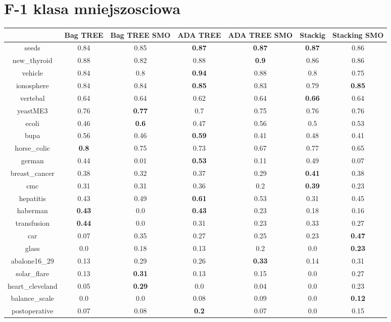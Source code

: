 \documentclass{article}%
\begin{document}
\section*{F{-}1 klasa mniejszosciowa}%
\begin{tabular}{c|cccccc}%
&Bag TREE&Bag TREE SMO&ADA TREE&ADA TREE SMO&Stackig&Stacking SMO\\%
\hline%
seeds&0.84&0.85&\textbf{0.87}&\textbf{0.87}&\textbf{0.87}&0.86\\%
new\_thyroid&0.88&0.82&0.88&\textbf{0.9}&0.86&0.86\\%
vehicle&0.84&0.8&\textbf{0.94}&0.88&0.8&0.75\\%
ionosphere&0.84&0.84&\textbf{0.85}&0.83&0.79&\textbf{0.85}\\%
vertebal&0.64&0.64&0.62&0.64&\textbf{0.66}&0.64\\%
yeastME3&0.76&\textbf{0.77}&0.7&0.75&0.76&0.76\\%
ecoli&0.46&\textbf{0.6}&0.47&0.56&0.5&0.53\\%
bupa&0.56&0.46&\textbf{0.59}&0.41&0.48&0.41\\%
horse\_colic&\textbf{0.8}&0.75&0.73&0.67&0.77&0.65\\%
german&0.44&0.01&\textbf{0.53}&0.11&0.49&0.07\\%
breast\_cancer&0.38&0.32&0.37&0.29&\textbf{0.41}&0.38\\%
cmc&0.31&0.31&0.36&0.2&\textbf{0.39}&0.23\\%
hepatitis&0.43&0.49&\textbf{0.61}&0.53&0.31&0.45\\%
haberman&\textbf{0.43}&0.0&\textbf{0.43}&0.23&0.18&0.16\\%
transfusion&\textbf{0.44}&0.0&0.31&0.23&0.33&0.27\\%
car&0.07&0.35&0.27&0.25&0.23&\textbf{0.47}\\%
glass&0.0&0.18&0.13&0.2&0.0&\textbf{0.23}\\%
abalone16\_29&0.13&0.29&0.26&\textbf{0.33}&0.14&0.31\\%
solar\_flare&0.13&\textbf{0.31}&0.13&0.15&0.0&0.27\\%
heart\_cleveland&0.05&\textbf{0.29}&0.0&0.04&0.0&0.23\\%
balance\_scale&0.0&0.0&0.08&0.09&0.0&\textbf{0.12}\\%
postoperative&0.07&0.08&\textbf{0.2}&0.07&0.0&0.15\\%
\end{tabular}

%
\end{document}
